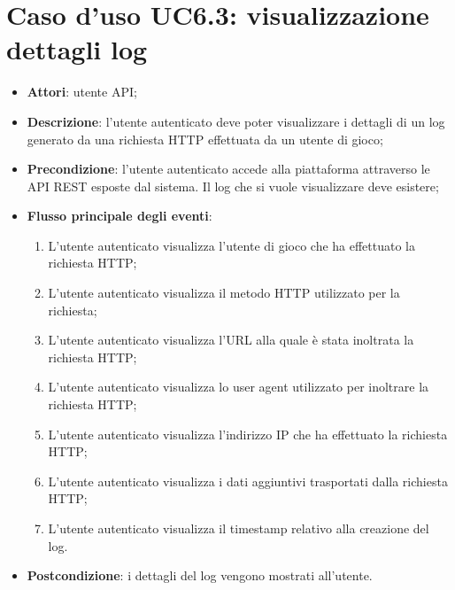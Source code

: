 \section{Caso d'uso UC6.3: visualizzazione dettagli log}
\begin{itemize}
\item \textbf{Attori}: utente API;
\item \textbf{Descrizione}: l'utente autenticato deve poter visualizzare i dettagli di un log generato da una richiesta HTTP effettuata da un utente di gioco; 
      \item \textbf{Precondizione}: l'utente autenticato accede alla piattaforma attraverso le API REST esposte dal sistema. Il log che si vuole visualizzare deve esistere;

        \item \textbf{Flusso principale degli eventi}:
          \begin{enumerate}
          \item L'utente autenticato visualizza l'utente di gioco che ha effettuato la richiesta HTTP;
          \item L'utente autenticato visualizza il metodo HTTP utilizzato per la richiesta;
          \item L'utente autenticato visualizza l'URL alla quale è stata inoltrata la richiesta HTTP;
          \item L'utente autenticato visualizza lo user agent utilizzato per inoltrare la richiesta HTTP;
          \item L'utente autenticato visualizza l'indirizzo IP che ha effettuato la richiesta HTTP;
          \item L'utente autenticato visualizza i dati aggiuntivi trasportati dalla richiesta HTTP;
          \item L'utente autenticato visualizza il timestamp relativo alla creazione del log.

      \end{enumerate}
    \item \textbf{Postcondizione}: i dettagli del log vengono mostrati all'utente.
  \end{itemize}
\hypertarget{UC6.4}{}
